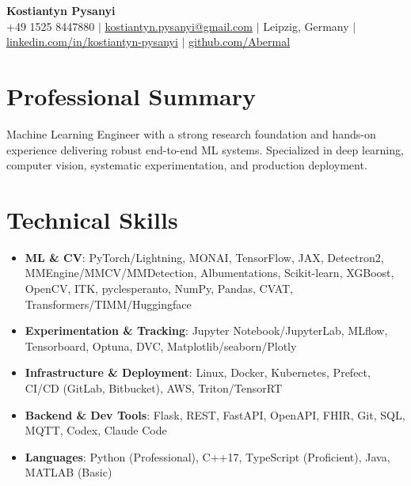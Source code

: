 \documentclass[letterpaper,10pt]{article}
\newcommand{\resumeItem}[1]{
    \item\small{#1}\vspace{-0.5pt}
}
\newcommand{\resumeSubHeadingList}{\begin{itemize}[leftmargin=0.15in, label={}]\vspace{-2pt}}
\newcommand{\resumeSubHeadingListEnd}{\end{itemize}}
\begin{document}
\begin{center}
  \textbf{\Huge Kostiantyn Pysanyi}\vspace{4pt} \\
  \small +49 1525 8447880 $|$ \href{mailto:kostiantyn.pysanyi@gmail.com}{kostiantyn.pysanyi@gmail.com} $|$ Leipzig, Germany $|$
  \href{https://www.linkedin.com/in/kostiantyn-pysanyi/}{linkedin.com/in/kostiantyn-pysanyi} $|$ \href{https://github.com/Abermal}{github.com/Abermal}
\end{center}

\addtolength{\voffset}{-18pt}
\enlargethispage{36pt}
\linespread{1.02}\selectfont



\vspace{-12pt}
\section{Professional Summary}
Machine Learning Engineer with a strong research foundation and hands-on experience delivering robust end-to-end ML systems. Specialized in deep learning, computer vision, systematic experimentation, and production deployment.

\section{Technical Skills}
\resumeSubHeadingList
  \resumeItem{\textbf{ML \& CV}: PyTorch/Lightning, MONAI, TensorFlow, JAX, Detectron2, MMEngine/MMCV/MMDetection, Albumentations, Scikit-learn, XGBoost, OpenCV, ITK, pyclesperanto, NumPy, Pandas, CVAT, Transformers/TIMM/Huggingface}
  \resumeItem{\textbf{Experimentation \& Tracking}: Jupyter Notebook/JupyterLab, MLflow, Tensorboard, Optuna, DVC, Matplotlib/seaborn/Plotly}
  \resumeItem{\textbf{Infrastructure \& Deployment}: Linux, Docker, Kubernetes, Prefect, CI/CD (GitLab, Bitbucket), AWS, Triton/TensorRT}
  \resumeItem{\textbf{Backend \& Dev Tools}: Flask, REST, FastAPI, OpenAPI, FHIR, Git, SQL, MQTT, Codex, Claude Code}
  \resumeItem{\textbf{Languages}: Python (Professional), C++17, TypeScript (Proficient), Java, MATLAB (Basic)}
\resumeSubHeadingListEnd
\end{document}
